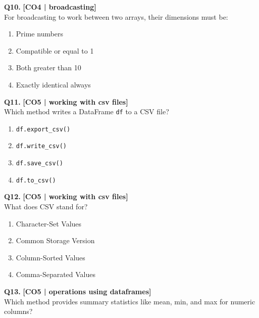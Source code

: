 \noindent\textbf{Q10.} \hfill {\small\color{LPUOrange}\textbf{[CO4 | broadcasting]}}\\[2pt]
For broadcasting to work between two arrays, their dimensions must be:

\begin{enumerate}[label=(\alph*),topsep=2pt,itemsep=1pt,partopsep=0pt,parsep=0pt]
    \item \relax Prime numbers
    \item \relax Compatible or equal to 1
    \item \relax Both greater than 10
    \item \relax Exactly identical always
\end{enumerate}
\vspace{{2mm}}

\noindent\textbf{Q11.} \hfill {\small\color{LPUOrange}\textbf{[CO5 | working with csv files]}}\\[2pt]
Which method writes a DataFrame \texttt{df} to a CSV file?

\begin{enumerate}[label=(\alph*),topsep=2pt,itemsep=1pt,partopsep=0pt,parsep=0pt]
    \item \relax \texttt{df.export\_csv()}
    \item \relax \texttt{df.write\_csv()}
    \item \relax \texttt{df.save\_csv()}
    \item \relax \texttt{df.to\_csv()}
\end{enumerate}
\vspace{{2mm}}

\noindent\textbf{Q12.} \hfill {\small\color{LPUOrange}\textbf{[CO5 | working with csv files]}}\\[2pt]
What does CSV stand for?

\begin{enumerate}[label=(\alph*),topsep=2pt,itemsep=1pt,partopsep=0pt,parsep=0pt]
    \item \relax Character-Set Values
    \item \relax Common Storage Version
    \item \relax Column-Sorted Values
    \item \relax Comma-Separated Values
\end{enumerate}
\vspace{{2mm}}

\noindent\textbf{Q13.} \hfill {\small\color{LPUOrange}\textbf{[CO5 | operations using dataframes]}}\\[2pt]
Which method provides summary statistics like mean, min, and max for numeric columns?

